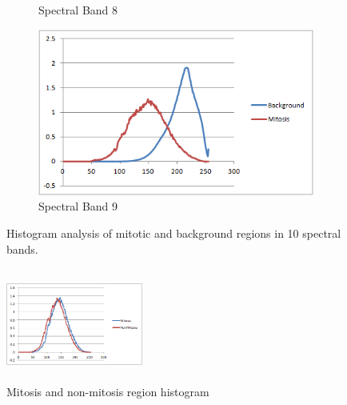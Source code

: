 \documentclass[10pt,twocolumn,letterpaper]{article}
\begin{document}
\begin{figure}[b]
\begin{subfigure}[b]{0.22\textwidth}
		\caption*{Spectral Band 8}
	\end{subfigure}
	\begin{subfigure}[b]{0.22\textwidth}
		\includegraphics[width=\textwidth]{diagrams/Band9.png}
		\caption*{Spectral Band 9}
	\end{subfigure}
	\caption{Histogram analysis of mitotic and background regions in 10 spectral bands.}
	\label{fig:bands_histogram}	
\end{figure}

\begin{figure}
	\centering
	\includegraphics[width=0.4\textwidth, height=37mm]{diagrams/histogram_mitosis_non_mitosis.png}
	\caption{Mitosis and non-mitosis region histogram }
	\label{fig:histogram_mitosis_non_mitosis}
\end{figure}
\end{document}
